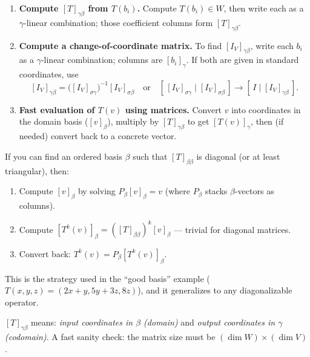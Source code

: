 \begin{examtip}[title={Exam Focus: three high-frequency workflows}]
\begin{enumerate}[leftmargin=*]
\item \textbf{Compute $[T]_{\gamma\beta}$ from $T(b_i)$.}
Compute $T(b_i)\in W$, then write each as a $\gamma$-linear combination; those coefficient columns form $[T]_{\gamma\beta}$.

\item \textbf{Compute a change-of-coordinate matrix.}
To find $[I_V]_{\gamma\beta}$, write each $b_i$ as a $\gamma$-linear combination; columns are $[b_i]_\gamma$.
If both are given in standard coordinates, use
\[
[I_V]_{\gamma\beta}=\bigl([I_V]_{\sigma\gamma}\bigr)^{-1}[I_V]_{\sigma\beta}
\quad\text{or}\quad
\left[\,[I_V]_{\sigma\gamma}\mid [I_V]_{\sigma\beta}\,\right]\to \left[\,I\mid [I_V]_{\gamma\beta}\,\right].
\]

\item \textbf{Fast evaluation of $T(v)$ using matrices.}
Convert $v$ into coordinates in the domain basis ($[v]_\beta$), multiply by $[T]_{\gamma\beta}$ to get $[T(v)]_\gamma$,
then (if needed) convert back to a concrete vector.
\end{enumerate}
\end{examtip}

\begin{examtip}[title={Exam Focus: computing $T^k(v)$ via a diagonalizing basis}]
If you can find an ordered basis $\beta$ such that $[T]_{\beta\beta}$ is diagonal (or at least triangular), then:
\begin{enumerate}[leftmargin=*]
\item Compute $[v]_\beta$ by solving $P_\beta [v]_\beta = v$ (where $P_\beta$ stacks $\beta$-vectors as columns).
\item Compute $[T^k(v)]_\beta = ([T]_{\beta\beta})^k [v]_\beta$ --- trivial for diagonal matrices.
\item Convert back: $T^k(v) = P_\beta [T^k(v)]_\beta$.
\end{enumerate}
This is the strategy used in the ``good basis'' example ($T(x,y,z)=(2x+y,5y+3z,8z)$), and it generalizes to any diagonalizable operator.
\end{examtip}

\begin{commonmistake}[title={Common Mistake: mixing up domain/codomain bases in $[T]_{\gamma\beta}$}]
$[T]_{\gamma\beta}$ means: \emph{input coordinates in $\beta$ (domain)} and \emph{output coordinates in $\gamma$ (codomain)}.
A fast sanity check: the matrix size must be $(\dim W)\times(\dim V)$.
\end{commonmistake}

